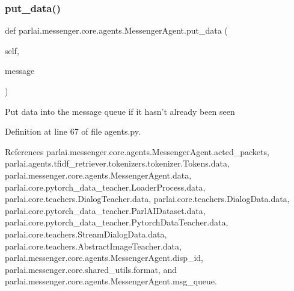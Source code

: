 \mbox{\label{classparlai_1_1messenger_1_1core_1_1agents_1_1MessengerAgent_acb0bd315f2b41ac178f5ec91a2d01f83}} 
\subsubsection{\texorpdfstring{put\+\_\+data()}{put\_data()}}
{\footnotesize\ttfamily def parlai.\+messenger.\+core.\+agents.\+Messenger\+Agent.\+put\+\_\+data (\begin{DoxyParamCaption}\item[{}]{self,  }\item[{}]{message }\end{DoxyParamCaption})}

\begin{DoxyVerb}Put data into the message queue if it hasn't already been seen\end{DoxyVerb}
 

Definition at line 67 of file agents.\+py.



References parlai.\+messenger.\+core.\+agents.\+Messenger\+Agent.\+acted\+\_\+packets, parlai.\+agents.\+tfidf\+\_\+retriever.\+tokenizers.\+tokenizer.\+Tokens.\+data, parlai.\+messenger.\+core.\+agents.\+Messenger\+Agent.\+data, parlai.\+core.\+pytorch\+\_\+data\+\_\+teacher.\+Loader\+Process.\+data, parlai.\+core.\+teachers.\+Dialog\+Teacher.\+data, parlai.\+core.\+teachers.\+Dialog\+Data.\+data, parlai.\+core.\+pytorch\+\_\+data\+\_\+teacher.\+Parl\+A\+I\+Dataset.\+data, parlai.\+core.\+pytorch\+\_\+data\+\_\+teacher.\+Pytorch\+Data\+Teacher.\+data, parlai.\+core.\+teachers.\+Stream\+Dialog\+Data.\+data, parlai.\+core.\+teachers.\+Abstract\+Image\+Teacher.\+data, parlai.\+messenger.\+core.\+agents.\+Messenger\+Agent.\+disp\+\_\+id, parlai.\+messenger.\+core.\+shared\+\_\+utils.\+format, and parlai.\+messenger.\+core.\+agents.\+Messenger\+Agent.\+msg\+\_\+queue.

\mbox{\label{classparlai_1_1messenger_1_1core_1_1agents_1_1MessengerAgent_a3a82460eeeb7928bbf0cd4d0cbde603a}} 
